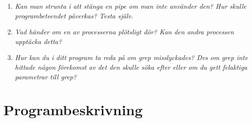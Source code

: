 \documentclass[paper=a4, fontsize=11pt]{scrartcl} %
\numberwithin{equation}{section} %
\numberwithin{figure}{section} %
\numberwithin{table}{section} %
\begin{document}
\begin{enumerate}[1)]
\item \emph{Kan man strunta i att stänga en pipe om man inte använder den? Hur skulle programbeteendet påverkas? Testa själv.}


\item \emph{Vad händer om en av processerna plötsligt dör? Kan den andra processen upptäcka detta?}


\item \emph{Hur kan du i ditt program ta reda på om grep misslyckades? Dvs om grep inte hittade någon förekomst av det den skulle söka efter eller om du gett felaktiga parametrar till grep?}

\end{enumerate}

\section{Programbeskrivning}


\end{document}
